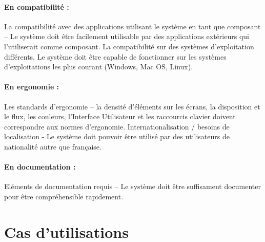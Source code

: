 \documentclass[12pt,a4paper,openany]{report}
\begin{document}
		\paragraph{En compatibilité :}
		La compatibilité avec des applications utilisant le système en tant que composant -- Le système doit être facilement
		utilisable par des applications extérieurs qui l'utiliserait comme composant.
		La compatibilité sur des systèmes d'exploitation différents. Le système doit être capable de fonctionner sur les 
		systèmes d'exploitations les plus courant (Windows, Mac OS, Linux).
		\paragraph{En ergonomie :}
		Les standards d'ergonomie -- la densité d'éléments sur les écrans, la disposition et le flux, les couleurs, l'Interface 
		Utilisateur et les raccourcis clavier doivent correspondre aux normes d'ergonomie.
		Internationalisation / besoins de localisation - Le système doit pouvoir être utilisé par des utilisateurs de nationalité autre que française.
		\paragraph{En documentation :}
		Eléments de documentation requis -- Le système doit être suffisament documenter pour être compréhensible rapidement.
	\newpage
	\section{Cas d'utilisations}
\end{document}
